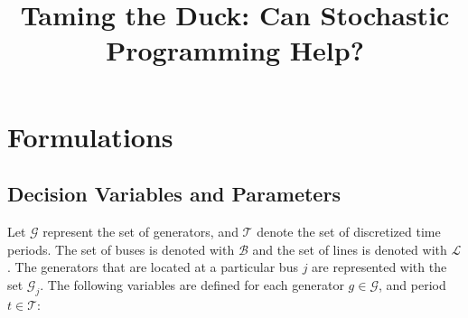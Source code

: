 

\setlength{\textheight}{23cm} %
\setlength{\topmargin}{-2cm}
\setlength{\textwidth}{17.5cm} \setlength{\oddsidemargin}{-0.5cm}
\setlength{\evensidemargin}{-0.5cm}

\setlength{\parindent}{0pt}

\newcommand{\gap}{\vspace{5pt}}
\newcommand{\epc}{\hspace{1pc}}

\newcommand{\onebld}{{\bf 1}}
\newcommand{\wt}{\widetilde}
\newcommand{\wh}{\widehat}

\newcommand{\E}{{\rm I\!E}}
\newcommand{\IP}{{\rm I\!P}}
\newcommand{\D}{{\rm I\!D}}
\newcommand{\pmat}[1]{\begin{pmatrix} #1 \end{pmatrix}}
\newcommand{\us}[1]{{\color{black}#1}}
\newcommand{\ssbs}[1]{{\color{blue}#1}}


\usepackage{mathtools}


\title{\bf Taming the Duck: Can Stochastic Programming Help?}
\date{}


\maketitle

\vspace*{-1.3cm}

\section{Formulations}

\subsection{Decision Variables and Parameters}

Let $\mathcal{G}$ represent the set of generators, and $\mathcal{T}$ denote the set of discretized time periods. The set of buses is denoted with $\mathcal{B}$ and the set of lines is denoted with $\mathcal{L}$. The generators that are located at a particular bus $j$ are represented with the set $\mathcal{G}_j$. The following variables are defined for each generator $g \in \mathcal{G}$, and period $t \in \mathcal{T}$:


